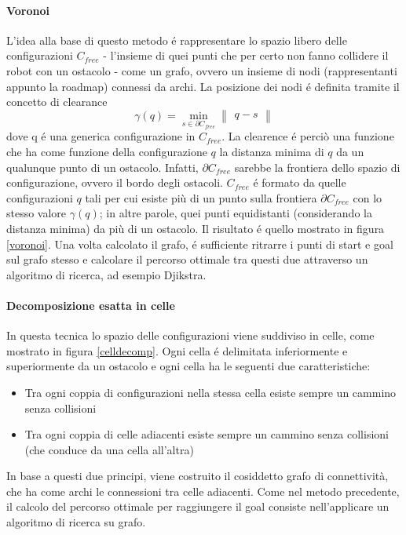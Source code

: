 \documentclass[14pt,a4paper]{extarticle}
\begin{document}
\paragraph{Voronoi} L'idea alla base di questo metodo é rappresentare lo spazio libero delle configurazioni \(C_{free}\) - l'insieme di quei punti che per certo non fanno collidere il robot con un ostacolo - come un grafo, ovvero un insieme di nodi (rappresentanti appunto la roadmap) connessi da archi. La posizione dei nodi é definita tramite il concetto di clearance \[\gamma(q) = \min_{s\in\partial C_{free}} \begin{Vmatrix}q-s\end{Vmatrix}\] dove q é una generica configurazione in \(C_{free}\). La clearence é perciò una funzione che ha come funzione della configurazione \(q\) la distanza minima di \(q\) da un qualunque punto di un ostacolo. Infatti, \(\partial C_{free}\) sarebbe la frontiera dello spazio di configurazione, ovvero il bordo degli ostacoli. \(C_{free}\) é formato da quelle configurazioni \(q\) tali per cui esiste più di un punto sulla frontiera \(\partial C_{free}\) con lo stesso valore \(\gamma(q)\); in altre parole, quei punti equidistanti (considerando la distanza minima) da più di un ostacolo. Il risultato é quello mostrato in figura \ref{voronoi}. Una volta calcolato il grafo, é sufficiente ritrarre i punti di start e goal sul grafo stesso e calcolare il percorso ottimale tra questi due attraverso un algoritmo di ricerca, ad esempio Djikstra.

\paragraph{Decomposizione esatta in celle} In questa tecnica lo spazio delle configurazioni viene suddiviso in celle, come mostrato in figura \ref{celldecomp}. Ogni cella é delimitata inferiormente e superiormente da un ostacolo e ogni cella ha le seguenti due caratteristiche:
\begin{itemize}
\item Tra ogni coppia di configurazioni nella stessa cella esiste sempre un cammino senza collisioni
\item Tra ogni coppia di celle adiacenti esiste sempre un cammino senza collisioni (che conduce da una cella all'altra)
\end{itemize}
In base a questi due principi, viene costruito il cosiddetto grafo di connettività, che ha come archi le connessioni tra celle adiacenti. Come nel metodo precedente, il calcolo del percorso ottimale per raggiungere il goal consiste nell'applicare un algoritmo di ricerca su grafo.
\end{document}
